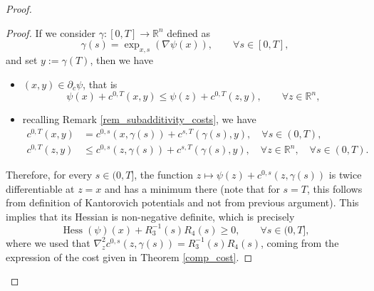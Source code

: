 \documentclass[reqno]{amsart}
\DeclareMathOperator{\Hess}{Hess}
\theoremstyle{plain}
\theoremstyle{definition}
\theoremstyle{remark}
\begin{document}
\begin{proof}
\begin{proof}
			If we consider $\gamma:[0,T]\to\mathbb{R}^n$ defined as 
			\begin{equation}
				\gamma(s)=\exp_{x,s}(\nabla\psi(x)),\qquad\forall s\in[0,T],
			\end{equation}
			and set $y:=\gamma(T)$, then we have
			\begin{itemize}
				\item $(x,y)\in\partial_c\psi$, that is 
				\begin{equation}
					\psi(x)+c^{0,T}(x,y)\leq\psi(z)+c^{0,T}(z,y),\qquad\forall z\in\mathbb{R}^n,
				\end{equation}
				\item recalling Remark \ref{rem_subadditivity_costs}, we have
				\begin{align}
					c^{0,T}(x,y)&=c^{0,s}(x,\gamma(s))+c^{s,T}(\gamma(s),y),\quad\forall s\in(0,T),\\
					c^{0,T}(z,y)&\leq c^{0,s}(z,\gamma(s))+c^{s,T}(\gamma(s),y),\quad\forall z\in\mathbb{R}^n,\quad\forall s\in(0,T).
				\end{align}
			\end{itemize}
			Therefore, for every $s\in(0,T]$, the function $z\mapsto\psi(z)+c^{0,s}(z,\gamma(s))$ is twice differentiable at $z=x$ and has a minimum there (note that for $s=T$, this follows from definition of Kantorovich potentials and not from previous argument). 
			This implies that its Hessian is non-negative definite, which is precisely 
			\begin{equation}
				\Hess(\psi)(x)+R_3^{-1}(s)R_4(s)\geq 0,\qquad\forall s\in(0,T],
			\end{equation}
			where we used that $\nabla^2_zc^{0,s}(z,\gamma(s))=R_3^{-1}(s)R_4(s)$, coming from the expression of the cost given in Theorem \ref{comp_cost}.
		\end{proof}
		

\end{proof}
\end{document}
